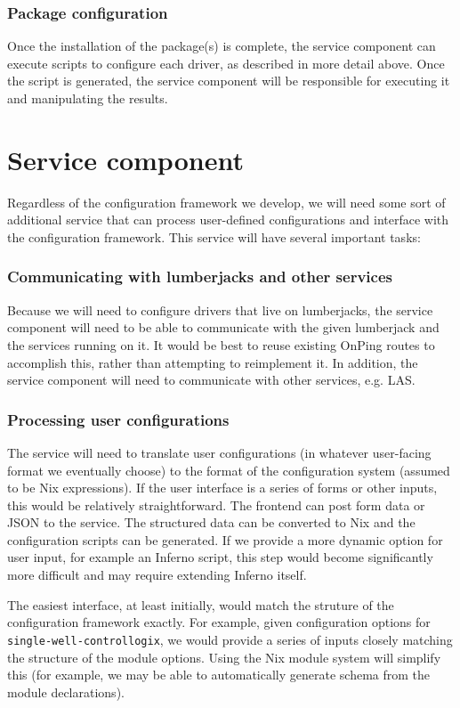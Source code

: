\documentclass[11pt]{article}
\begin{document}
\subsubsection*{Package configuration}
\label{sec:org2fbc59f}
Once the installation of the package(s) is complete, the service component can execute scripts to configure each driver, as described in more detail above. Once the script is generated, the service component will be responsible for executing it and manipulating the results.
\section*{Service component}
\label{sec:org098f5b2}
Regardless of the configuration framework we develop, we will need some sort of additional service that can process user-defined configurations and interface with the configuration framework. This service will have several important tasks:
\subsubsection*{Communicating with lumberjacks and other services}
\label{sec:orgfb005a1}
Because we will need to configure drivers that live on lumberjacks, the service component will need to be able to communicate with the given lumberjack and the services running on it. It would be best to reuse existing OnPing routes to accomplish this, rather than attempting to reimplement it. In addition, the service component will need to communicate with other services, e.g. LAS.
\subsubsection*{Processing user configurations}
\label{sec:orgd13d295}
The service will need to translate user configurations (in whatever user-facing format we eventually choose) to the format of the configuration system (assumed to be Nix expressions). If the user interface is a series of forms or other inputs, this would be relatively straightforward. The frontend can post form data or JSON to the service. The structured data can be converted to Nix and the configuration scripts can be generated. If we provide a more dynamic option for user input, for example an Inferno script, this step would become significantly more difficult and may require extending Inferno itself.

The easiest interface, at least initially, would match the struture of the configuration framework exactly. For example, given configuration options for \texttt{single-well-controllogix}, we would provide a series of inputs closely matching the structure of the module options. Using the Nix module system will simplify this (for example, we may be able to automatically generate schema from the module declarations).
\end{document}
